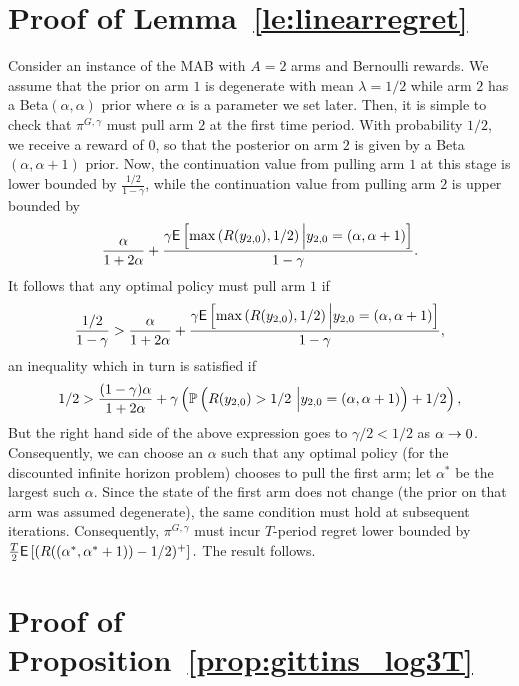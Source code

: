 \appendix
\section{Proof of Lemma~\ref{le:linearregret}} \label{proof:linearregret}
\begin{myproof}[Proof.]
	Consider an instance of the MAB with $A=2$ arms and Bernoulli rewards. We assume that the prior on arm $1$ is degenerate with mean $\lambda = 1/2$ while arm $2$ has a {\rm Beta}$(\alpha,\alpha)$ prior where $\alpha$ is a parameter we set later. Then, it is simple to check that $\pi^{G,\gamma}$ must pull arm $2$ at the first time period. With probability $1/2$, we receive a reward of $0$, so that the posterior on arm $2$ is given by a {\rm Beta}$(\alpha,\alpha+1)$ prior. Now, the continuation value from pulling arm $1$ at this stage is lower bounded by $\frac{1/2}{1-\gamma}$, while the continuation value from pulling arm $2$ is upper bounded by
	\[
	\frac{\alpha}{1+2\alpha}
	+
	\frac{
		\gamma
		\E
		\left[
		\max\left(
		R(y_{2,0}),1/2
		\right)
		\Big| y_{2,0} = \left(\alpha, \alpha+1 \right)
		\right]
	}
	{
		1-\gamma
	}.
	\]
	It follows that any optimal policy must pull arm $1$ if
	\[
	\frac{1/2}{1-\gamma}
	>
	\frac{\alpha}{1+2\alpha}
	+
	\frac{
		\gamma
		\E
		\left[
		\max\left(
		R(y_{2,0}),1/2
		\right)
		\Big| y_{2,0} = \left(\alpha, \alpha+1 \right)
		\right]
	}
	{
		1-\gamma
	},
	\]
	{\color{blue}an inequality which in turn is satisfied if
	\[
	1/2
	>
	\frac{(1-\gamma)\alpha}{1+2\alpha}
	+
	\gamma
	\left(\P{
		R(y_{2,0})>1/2 \
		\Big| y_{2,0} = \left(\alpha, \alpha+1 \right)
	} + 1/2\right) ,
	\]
	But the right hand side of the above expression goes to $\gamma/2 < 1/2$ as $\alpha \tends 0$}. Consequently, we can choose an $\alpha$ such that any optimal policy (for the discounted infinite horizon problem) chooses to pull the first arm; let $\alpha^*$ be the largest such $\alpha$. Since the state of the first arm does not change (the prior on that arm was assumed degenerate), the same condition must hold at subsequent iterations. Consequently, $\pi^{G,\gamma}$ must incur $T$-period regret lower bounded by 
	$\frac{T}{2}
	\E
	\left[
	(
	R((\alpha^*,\alpha^*+1)) - 1/2
	)^+
	\right].
	$
	The result follows. 
\end{myproof}
\section{Proof of Proposition~\ref{prop:gittins_log3T}} \label{proof:prop_log3T}

